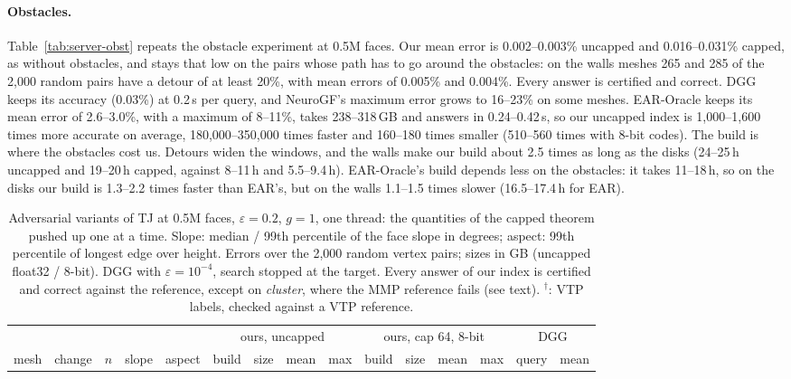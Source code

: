 \documentclass[sigconf,nonacm,screen]{acmart}
\newcommand{\eps}{\varepsilon}
\begin{document}
\paragraph{Obstacles.}
Table~\ref{tab:server-obst} repeats the obstacle experiment at 0.5M faces. Our mean error is 0.002--0.003\%
uncapped and 0.016--0.031\% capped, as without obstacles, and stays that low on the pairs whose path has to go around
the obstacles: on the walls meshes 265 and 285 of the 2,000 random pairs have a detour of at least 20\%, with mean
errors of 0.005\% and 0.004\%. Every answer is certified and correct. DGG keeps its accuracy (0.03\%) at 0.2\,s per
query, and NeuroGF's maximum error grows to 16--23\% on some meshes. EAR-Oracle keeps its mean error of 2.6--3.0\%,
with a maximum of 8--11\%, takes 238--318\,GB and answers in 0.24--0.42\,s, so our uncapped index is 1,000--1,600
times more accurate on average, 180,000--350,000 times faster and 160--180 times smaller (510--560 times with 8-bit
codes). The build is where the obstacles cost us. Detours widen the windows, and the walls make our build about 2.5
times as long as the disks (24--25\,h uncapped and 19--20\,h capped, against 8--11\,h and 5.5--9.4\,h). EAR-Oracle's
build depends less on the obstacles: it takes 11--18\,h, so on the disks our build is 1.3--2.2 times faster than EAR's,
but on the walls 1.1--1.5 times slower (16.5--17.4\,h for EAR).

\begin{table}[t]
\caption{Adversarial variants of TJ at 0.5M faces, $\eps=0.2$, $g=1$, one thread: the quantities of the capped
theorem pushed up one at a time. Slope: median / 99th percentile of the face slope in degrees; aspect: 99th
percentile of longest edge over height. Errors over the 2,000 random vertex pairs; sizes in GB (uncapped float32 /
8-bit). DGG with $\eps=10^{-4}$, search stopped at the target. Every answer of our index is certified and correct
against the reference, except on \emph{cluster}, where the MMP reference fails (see text). $^\dagger$: VTP labels,
checked against a VTP reference.}
\label{tab:adversarial}
\small
\setlength{\tabcolsep}{3pt}
\begin{tabular}{@{}ll rrr|rrrr|rrrr|rr@{}}
\toprule
 & & & & & \multicolumn{4}{c|}{ours, uncapped} & \multicolumn{4}{c|}{ours, cap 64, 8-bit} & \multicolumn{2}{c}{DGG}\\
mesh & change & $n$ & slope & aspect & build & size & mean & max & build & size & mean & max & query & mean\\
\midrule

\end{tabular}
\end{table}
\end{document}
